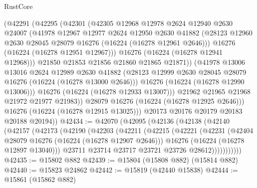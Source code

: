 \begin{lexlean}{RustCore}
\begin{coremodule}
                (@42291
                  (@42295
                    (@42301
                      (@42305
                        @12968
                        @12978
                        @2624
                        @12940
                        @2630
                        @24007
                        (@41978
                          @12967
                          @12977
                          @2624
                          @12950
                          @2630
                          @41882
                          (@28123 @12960 @2630 @28045 @28079 @16276 (@16224 (@16278 @12961 @2646)))
                          @16276
                          (@16224 (@16278 @12951 @12967)))
                        @16276
                        (@16224 (@16278 @12941 @12968)))
                      @21850
                      @21853
                      @21856
                      @21860
                      @21865
                      @21871))
                  (@41978
                    @13006
                    @13016
                    @2624
                    @12989
                    @2630
                    @41882
                    (@28123 @12999 @2630 @28045 @28079 @16276 (@16224 (@16278 @13000 @2646)))
                    @16276
                    (@16224 (@16278 @12990 @13006)))
                  @16276
                  (@16224 (@16278 @12933 @13007)))
                @21962
                @21965
                @21968
                @21972
                @21977
                @21983))
            @28079
            @16276
            (@16224 (@16278 @12925 @2646)))
          @16276
          (@16224 (@16278 @12915 @13025)))
        @20173
        @20176
        @20179
        @20183
        @20188
        @20194))
@42434 := @42070
    (@42095
      (@42136
        (@42138
          (@42140
            (@42157
              (@42173
                (@42190
                  (@42203
                    (@42211
                      (@42215
                        (@42221
                          (@42231
                            (@42404 @28079 @16276 (@16224 (@16278 @12907 @2646)))
                            @16276
                            (@16224 (@16278 @12897 @13040)))
                          @23711
                          @23714
                          @23717
                          @23721
                          @23726
                          @28612)))))))))))
@42435 := @15802 @882
@42439 := @15804 (@15808 @882) (@15814 @882)
@42440 := @15823 @24862
@42442 := @15819 (@42440 @15838)
@42444 := @15861 (@15862 @882)

\end{coremodule}
\end{lexlean}
